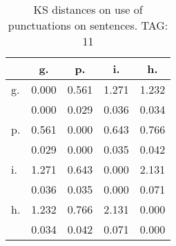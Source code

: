 \begin{table}[h!]
\begin{center}
\begin{tabular}{| l | c | c | c | c |}\hline
 & g. & p. & i. & h. \\\hline
g. & 0.000  & 0.561  & 1.271  & 1.232 \\\hline
 & 0.000  & 0.029  & 0.036  & 0.034 \\\hline
p. & 0.561  & 0.000  & 0.643  & 0.766 \\\hline
 & 0.029  & 0.000  & 0.035  & 0.042 \\\hline
i. & 1.271  & 0.643  & 0.000  & 2.131 \\\hline
 & 0.036  & 0.035  & 0.000  & 0.071 \\\hline
h. & 1.232  & 0.766  & 2.131  & 0.000 \\\hline
 & 0.034  & 0.042  & 0.071  & 0.000 \\\hline
\end{tabular}
\caption{KS distances on use of punctuations on sentences. TAG: 11}
\end{center}
\end{table}